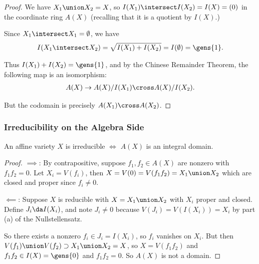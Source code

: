 \begin{proof}

We have \(X_1 \union X_2 = X\), so
\(I(X_1) \intersect I(X_2) = I(X) = (0)\) in the coordinate ring
\(A(X)\) (recalling that it is a quotient by \(I(X)\).)

Since \(X_1 \intersect X_1 = \emptyset\), we have
\begin{align*}  
I(X_1 \intersect X_2) = \sqrt{I(X_1) + I(X_2) } = I(\emptyset) = \gens{1}
.\end{align*}

Thus \(I(X_1) + I(X_2) = \gens{1}\), and by the Chinese Remainder
Theorem, the following map is an isomorphism:
\begin{align*}  
A(X) \to A(X)/I(X_1) \cross A(X) / I(X_2)
.\end{align*}

But the codomain is precisely \(A(X_1) \cross A(X_2)\).

\end{proof}

\hypertarget{irreducibility-on-the-algebra-side}{%
\subsubsection{Irreducibility on the Algebra
Side}\label{irreducibility-on-the-algebra-side}}

\begin{proposition}[?]

An affine variety \(X\) is irreducible \(\iff\) \(A(X)\) is an integral
domain.

\end{proposition}

\begin{proof}

\(\implies\): By contrapositive, suppose \(f_1, f_2 \in A(X)\) are
nonzero with \(f_1 f_2 = 0\). Let \(X_i = V(f_i)\), then
\(X= V(0) = V(f_1 f_2) = X_1 \union X_2\) which are closed and proper
since \(f_i \neq 0\).

\hfill\break

\(\impliedby\): Suppose \(X\) is reducible with \(X = X_1 \union X_2\)
with \(X_i\) proper and closed. Define \(J_i \da I(X_i)\), and note
\(J_i \neq 0\) because \(V(J_i) = V(I(X_i)) = X_i\) by part (a) of the
Nullstellensatz.

So there exists a nonzero \(f_i \in J_i = I(X_i)\), so \(f_i\) vanishes
on \(X_i\). But then
\(V(f_1) \union V(f_2) \supset X_1 \union X_2 = X\), so
\(X= V(f_1 f_2)\) and \(f_1 f_2 \in I(X) = \gens{0}\) and
\(f_1 f_2 = 0\). So \(A(X)\) is not a domain.

\end{proof}

